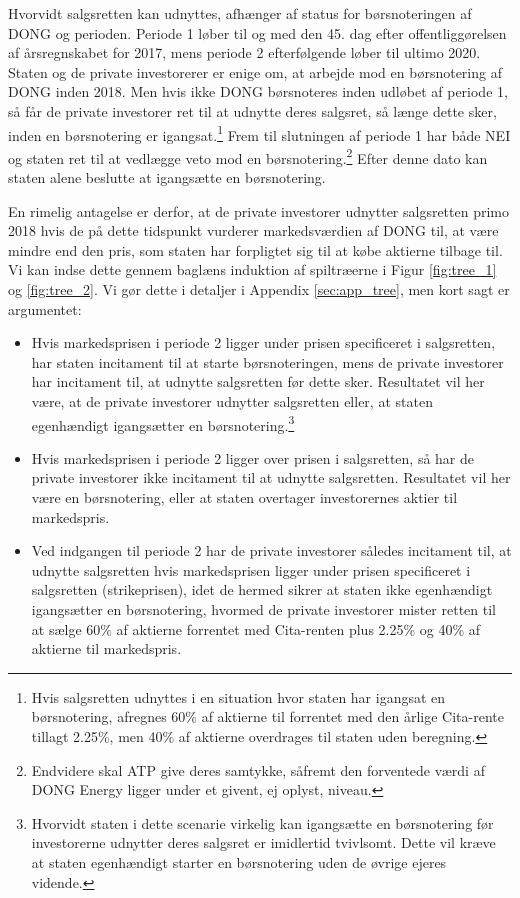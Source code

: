 \documentclass{article}
\begin{document}
Hvorvidt salgsretten kan udnyttes, afhænger af status for børsnoteringen af DONG og perioden. Periode 1 løber til og med den 45. dag efter offentliggørelsen af årsregnskabet for 2017, mens periode 2 efterfølgende løber til ultimo 2020. Staten og de private investorerer er enige om, at arbejde mod en børsnotering af DONG inden 2018. Men hvis ikke DONG børsnoteres inden udløbet af periode 1, så får de private investorer ret til at udnytte deres salgsret, så længe dette sker, inden en børsnotering er igangsat.\footnote{Hvis salgsretten udnyttes i en situation hvor staten har igangsat en børsnotering, afregnes 60\% af aktierne til  forrentet med den årlige Cita-rente tillagt 2.25\%, men 40\% af aktierne overdrages til staten uden beregning.} Frem til slutningen af periode 1 har både NEI og staten ret til at vedlægge veto mod en børsnotering.\footnote{Endvidere skal ATP give deres samtykke, såfremt den forventede værdi af DONG Energy ligger under et givent, ej oplyst, niveau.} Efter denne dato kan staten alene beslutte at igangsætte en børsnotering.

En rimelig antagelse er derfor, at de private investorer udnytter salgsretten primo 2018 hvis de på dette tidspunkt vurderer markedsværdien af DONG til, at være mindre end den pris, som staten har forpligtet sig til at købe aktierne tilbage til. Vi kan indse dette gennem baglæns induktion af spiltræerne i Figur \ref{fig:tree_1} og \ref{fig:tree_2}. Vi gør dette i detaljer i Appendix \ref{sec:app_tree}, men kort sagt er argumentet:

\begin{itemize}
	\item Hvis markedsprisen i periode 2 ligger under prisen specificeret i salgsretten, har staten incitament til at starte børsnoteringen, mens de private investorer har incitament til, at udnytte salgsretten før dette sker. Resultatet vil her være, at de private investorer udnytter salgsretten eller, at staten egenhændigt igangsætter en børsnotering.\footnote{Hvorvidt staten i dette scenarie virkelig kan igangsætte en børsnotering før investorerne udnytter deres salgsret er imidlertid tvivlsomt. Dette vil kræve at staten egenhændigt starter en børsnotering uden de øvrige ejeres vidende.}
	\item Hvis markedsprisen i periode 2 ligger over prisen i salgsretten, så har de private investorer ikke incitament til at udnytte salgsretten. Resultatet vil her være en børsnotering, eller at staten overtager investorernes aktier til markedspris.
	\item Ved indgangen til periode 2 har de private investorer således incitament til, at udnytte salgsretten hvis markedsprisen ligger under prisen specificeret i salgsretten (strikeprisen), idet de hermed sikrer at staten ikke egenhændigt igangsætter en børsnotering, hvormed de private investorer mister retten til at sælge 60\% af aktierne forrentet med Cita-renten plus 2.25\% og 40\% af aktierne til markedspris.
\end{itemize} 
\end{document}
